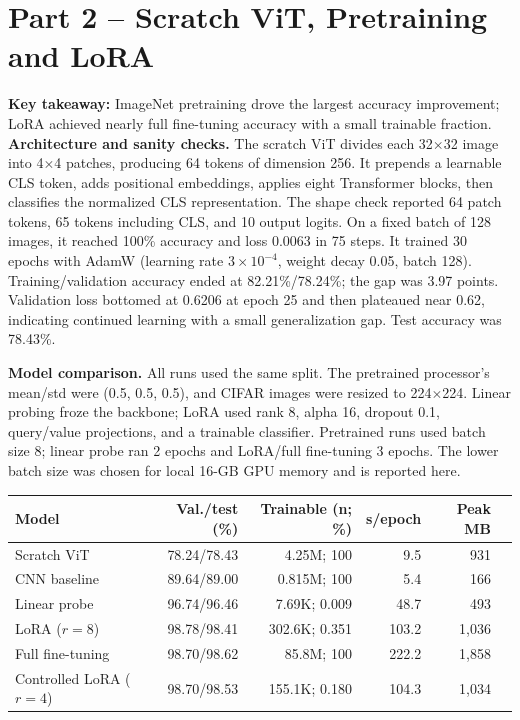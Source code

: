 \documentclass[11pt]{article}
\begin{document}
\section{Part 2 -- Scratch ViT, Pretraining and LoRA}
\textbf{Key takeaway:} ImageNet pretraining drove the largest accuracy improvement; LoRA achieved nearly full fine-tuning accuracy with a small trainable fraction.
\textbf{Architecture and sanity checks.} The scratch ViT divides each 32$\times$32 image into 4$\times$4 patches, producing 64 tokens of dimension 256. It prepends a learnable CLS token, adds positional embeddings, applies eight Transformer blocks, then classifies the normalized CLS representation. The shape check reported 64 patch tokens, 65 tokens including CLS, and 10 output logits. On a fixed batch of 128 images, it reached 100\% accuracy and loss 0.0063 in 75 steps. It trained 30 epochs with AdamW (learning rate $3\times10^{-4}$, weight decay 0.05, batch 128). Training/validation accuracy ended at 82.21\%/78.24\%; the gap was 3.97 points. Validation loss bottomed at 0.6206 at epoch 25 and then plateaued near 0.62, indicating continued learning with a small generalization gap. Test accuracy was 78.43\%.

\newpage
\textbf{Model comparison.} All runs used the same split. The pretrained processor's mean/std were (0.5, 0.5, 0.5), and CIFAR images were resized to 224$\times$224. Linear probing froze the backbone; LoRA used rank 8, alpha 16, dropout 0.1, query/value projections, and a trainable classifier. Pretrained runs used batch size 8; linear probe ran 2 epochs and LoRA/full fine-tuning 3 epochs. The lower batch size was chosen for local 16-GB GPU memory and is reported here.

\scriptsize
\begin{center}
\begin{tabularx}{\linewidth}{@{}X r r r r r@{}}
\toprule
Model & Val./test (\%) & Trainable (n; \%) & s/epoch & Peak MB\\
\midrule
Scratch ViT & 78.24/78.43 & 4.25M; 100 & 9.5 & 931\\
CNN baseline & 89.64/89.00 & 0.815M; 100 & 5.4 & 166\\
Linear probe & 96.74/96.46 & 7.69K; 0.009 & 48.7 & 493\\
LoRA ($r=8$) & 98.78/98.41 & 302.6K; 0.351 & 103.2 & 1,036\\
Full fine-tuning & 98.70/98.62 & 85.8M; 100 & 222.2 & 1,858\\
Controlled LoRA ($r=4$) & 98.70/98.53 & 155.1K; 0.180 & 104.3 & 1,034\\
\bottomrule
\end{tabularx}
\end{center}
\normalsize
\end{document}
